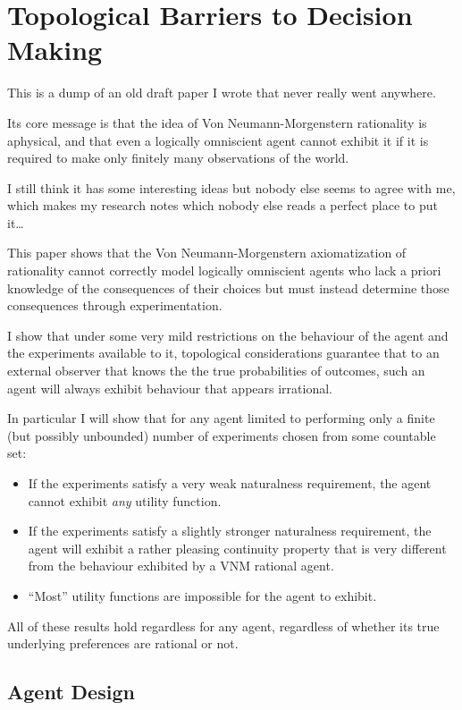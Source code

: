 \documentclass[a4paper]{book}
\begin{document}
\chapter{Topological Barriers to Decision Making}

This is a dump of an old draft paper I wrote that never really went anywhere.

Its core message is that the idea of Von Neumann-Morgenstern rationality is aphysical,
and that even a logically omniscient agent cannot exhibit it if it is required to make only finitely many observations of the world.

I still think it has some interesting ideas but nobody else seems to agree with me,
which makes my research notes which nobody else reads a perfect place to put it\ldots

This paper shows that the Von Neumann-Morgenstern axiomatization of rationality
cannot correctly model logically omniscient agents who lack a priori
knowledge of the consequences of their choices but must instead determine
those consequences through experimentation.

I show that under some very mild restrictions on the behaviour of the agent
and the experiments available to it, topological considerations guarantee
that to an external observer that knows the the true probabilities of outcomes,
such an agent will always exhibit behaviour that appears irrational.

In particular I will show that for any agent limited to performing only a finite
(but possibly unbounded) number of experiments chosen from some countable set:

\begin{itemize}
\item If the experiments satisfy a very weak naturalness requirement, the agent
cannot exhibit \textit{any} utility function.
\item If the experiments satisfy a slightly stronger naturalness requirement,
the agent will exhibit a rather
pleasing continuity property that is very different from the behaviour exhibited
by a VNM rational agent.
\item ``Most'' utility functions are impossible for the agent to exhibit.
\end{itemize}

All of these results hold regardless for any agent, regardless of whether
its true underlying preferences are rational or not.

\section{Agent Design}
\end{document}
